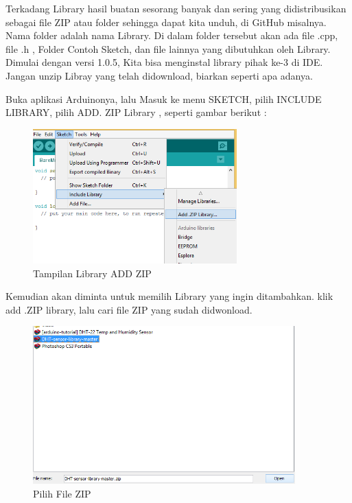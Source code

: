 \begin{enumerate}
\par Terkadang Library hasil buatan sesorang banyak dan sering yang didistribusikan sebagai file ZIP atau folder sehingga dapat kita unduh, di GitHub misalnya. Nama folder adalah nama Library. Di dalam folder tersebut akan ada file .cpp, file .h , Folder Contoh Sketch, dan file lainnya yang dibutuhkan oleh Library. Dimulai dengan versi 1.0.5, Kita bisa menginstal library pihak ke-3 di IDE. Jangan unzip Libray yang telah didownload, biarkan seperti apa adanya.

\par Buka aplikasi Arduinonya, lalu Masuk ke menu SKETCH, pilih INCLUDE LIBRARY, pilih ADD. ZIP Library , seperti gambar berikut :
\begin{figure}[H]
\centering
\includegraphics[width=0.7\textwidth]{figures/library1.png}
\caption{Tampilan Library ADD ZIP}
\label{print}
\end{figure}

\par Kemudian  akan diminta untuk memilih Library yang ingin ditambahkan. klik add .ZIP library, lalu cari file ZIP yang sudah didwonload.
\begin{figure}[H]
\centering
\includegraphics[width=0.9\textwidth]{figures/library2.png}
\caption{Pilih File ZIP}
\label{print}
\end{figure}


\end{enumerate}
